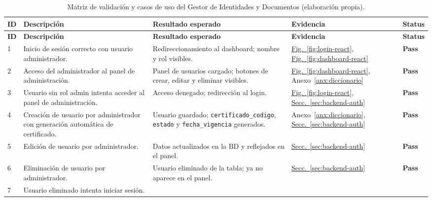 \documentclass[10pt,letterpaper]{report}
\begin{document}
\begin{longtable}{p{} p{} p{} p{} p{}}
\caption{Matriz de validación y casos de uso del Gestor de Identidades y Documentos (elaboración propia).}
\label{tab:validaciones}\\
\toprule
\textbf{ID} & \textbf{Descripción} & \textbf{Resultado esperado} & \textbf{Evidencia} & \textbf{Status} \\
\midrule
\endfirsthead
\toprule
\textbf{ID} & \textbf{Descripción} & \textbf{Resultado esperado} & \textbf{Evidencia} & \textbf{Status} \\
\midrule
\endhead
1 & Inicio de sesión correcto con usuario administrador. &
  Redireccionamiento al dashboard; nombre y rol visibles. &
  \hyperref[fig:login-react]{Fig.~\ref*{fig:login-react}}, \hyperref[fig:dashboard-react]{Fig.~\ref*{fig:dashboard-react}} &
  \textcolor{passgreen}{\textbf{Pass}} \\
\midrule
2 & Acceso del administrador al panel de administración. &
  Panel de usuarios cargado; botones de crear, editar y eliminar visibles. &
  \hyperref[fig:dashboard-react]{Fig.~\ref*{fig:dashboard-react}}, Anexo~\ref{anx:diccionario} &
  \textcolor{passgreen}{\textbf{Pass}} \\
\midrule
3 & Usuario sin rol admin intenta acceder al panel de administración. &
  Acceso denegado; redirección al login. &
  \hyperref[fig:login-react]{Fig.~\ref*{fig:login-react}}, \hyperref[sec:backend-auth]{Secc.~\ref*{sec:backend-auth}} &
  \textcolor{passgreen}{\textbf{Pass}} \\
\midrule
4 & Creación de usuario por administrador con generación automática de certificado. &
  Usuario guardado; \texttt{certificado\_codigo}, \texttt{estado} y \texttt{fecha\_vigencia} generados. &
  Anexo~\ref{anx:diccionario}, \hyperref[sec:backend-auth]{Secc.~\ref*{sec:backend-auth}} &
  \textcolor{passgreen}{\textbf{Pass}} \\
\midrule
5 & Edición de usuario por administrador. &
  Datos actualizados en la BD y reflejados en el panel. &
  \hyperref[sec:backend-auth]{Secc.~\ref*{sec:backend-auth}} &
  \textcolor{passgreen}{\textbf{Pass}} \\
\midrule
6 & Eliminación de usuario por administrador. &
  Usuario eliminado de la tabla; ya no aparece en el panel. &
  \hyperref[sec:backend-auth]{Secc.~\ref*{sec:backend-auth}} &
  \textcolor{passgreen}{\textbf{Pass}} \\
\midrule
7 & Usuario eliminado intenta iniciar sesión. &

\end{longtable}
\end{document}

